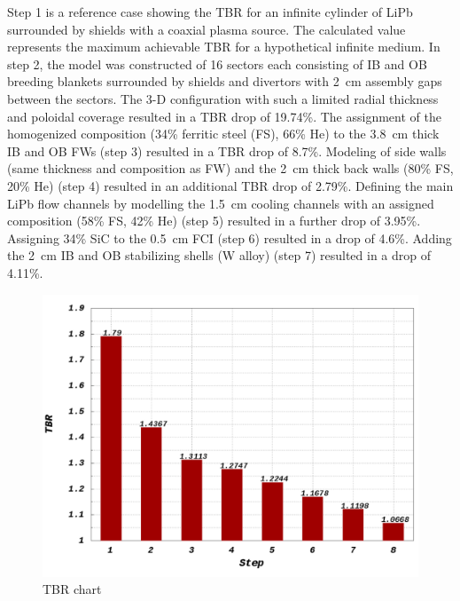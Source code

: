 \documentclass[12pt, letterpaper]{elsarticle}
\begin{document}
Step 1 is a reference case showing the TBR for an infinite cylinder of LiPb surrounded by shields with a coaxial plasma source. The calculated value represents the maximum achievable TBR for a hypothetical infinite medium. In step 2, the model was constructed of 16 sectors each consisting of IB and OB breeding blankets surrounded by shields and divertors with \SI{2}{cm} assembly gaps between the sectors. The 3-D configuration with such a limited radial thickness and poloidal coverage resulted in a TBR drop of 19.74\%. The assignment of the homogenized composition (34\% ferritic steel (FS), 66\% He) to the \SI{3.8}{cm} thick IB and OB FWs (step 3) resulted in a TBR drop of 8.7\%. Modeling of side walls (same thickness and composition as FW) and the \SI{2}{cm} thick back walls (80\% FS, 20\% He) (step 4) resulted in an additional TBR drop of 2.79\%. Defining the main LiPb flow channels by modelling the \SI{1.5}{cm} cooling channels with an assigned composition (58\% FS, 42\% He) (step 5) resulted in a further drop of 3.95\%. Assigning 34\% SiC to the \SI{0.5}{cm} FCI (step 6) resulted in a drop of 4.6\%. Adding the \SI{2}{cm} IB and OB stabilizing shells (W alloy) (step 7) resulted in a drop of 4.11\%.
\begin{figure}[h!]
  \centering
  \includegraphics[scale=0.3]{../plots/TBR_chart.png}
  \caption{TBR chart}
  \label{fig:TBR chart}
\end{figure}
\end{document}
